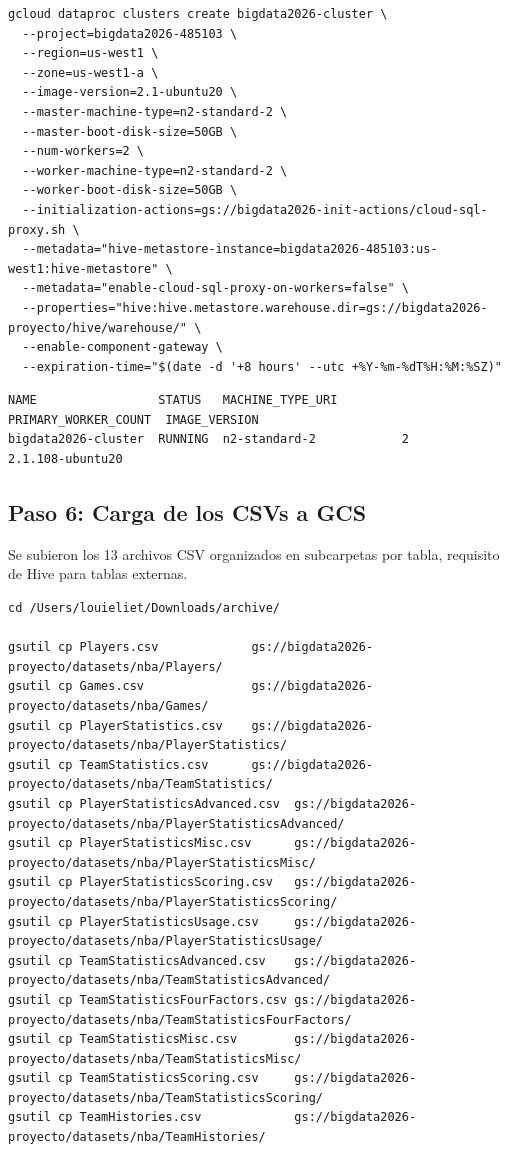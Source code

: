 \documentclass[12pt, letterpaper]{article}
\begin{document}
\begin{lstlisting}[style=codestyle, caption={Creación del cluster Dataproc con Hive sobre Cloud SQL y GCS}]
gcloud dataproc clusters create bigdata2026-cluster \
  --project=bigdata2026-485103 \
  --region=us-west1 \
  --zone=us-west1-a \
  --image-version=2.1-ubuntu20 \
  --master-machine-type=n2-standard-2 \
  --master-boot-disk-size=50GB \
  --num-workers=2 \
  --worker-machine-type=n2-standard-2 \
  --worker-boot-disk-size=50GB \
  --initialization-actions=gs://bigdata2026-init-actions/cloud-sql-proxy.sh \
  --metadata="hive-metastore-instance=bigdata2026-485103:us-west1:hive-metastore" \
  --metadata="enable-cloud-sql-proxy-on-workers=false" \
  --properties="hive:hive.metastore.warehouse.dir=gs://bigdata2026-proyecto/hive/warehouse/" \
  --enable-component-gateway \
  --expiration-time="$(date -d '+8 hours' --utc +%Y-%m-%dT%H:%M:%SZ)"
\end{lstlisting}

\begin{lstlisting}[style=outputstyle, caption={Evidencia --- cluster RUNNING, imagen 2.1 Ubuntu 20, n2-standard-2}]
NAME                 STATUS   MACHINE_TYPE_URI         PRIMARY_WORKER_COUNT  IMAGE_VERSION
bigdata2026-cluster  RUNNING  n2-standard-2            2                     2.1.108-ubuntu20
\end{lstlisting}

\subsection{Paso 6: Carga de los CSVs a GCS}

Se subieron los 13 archivos CSV organizados en subcarpetas por tabla, requisito de Hive para tablas externas.

\begin{lstlisting}[style=codestyle, caption={Carga de los 13 archivos CSV al bucket de GCS}]
cd /Users/louieliet/Downloads/archive/

gsutil cp Players.csv             gs://bigdata2026-proyecto/datasets/nba/Players/
gsutil cp Games.csv               gs://bigdata2026-proyecto/datasets/nba/Games/
gsutil cp PlayerStatistics.csv    gs://bigdata2026-proyecto/datasets/nba/PlayerStatistics/
gsutil cp TeamStatistics.csv      gs://bigdata2026-proyecto/datasets/nba/TeamStatistics/
gsutil cp PlayerStatisticsAdvanced.csv  gs://bigdata2026-proyecto/datasets/nba/PlayerStatisticsAdvanced/
gsutil cp PlayerStatisticsMisc.csv      gs://bigdata2026-proyecto/datasets/nba/PlayerStatisticsMisc/
gsutil cp PlayerStatisticsScoring.csv   gs://bigdata2026-proyecto/datasets/nba/PlayerStatisticsScoring/
gsutil cp PlayerStatisticsUsage.csv     gs://bigdata2026-proyecto/datasets/nba/PlayerStatisticsUsage/
gsutil cp TeamStatisticsAdvanced.csv    gs://bigdata2026-proyecto/datasets/nba/TeamStatisticsAdvanced/
gsutil cp TeamStatisticsFourFactors.csv gs://bigdata2026-proyecto/datasets/nba/TeamStatisticsFourFactors/
gsutil cp TeamStatisticsMisc.csv        gs://bigdata2026-proyecto/datasets/nba/TeamStatisticsMisc/
gsutil cp TeamStatisticsScoring.csv     gs://bigdata2026-proyecto/datasets/nba/TeamStatisticsScoring/
gsutil cp TeamHistories.csv             gs://bigdata2026-proyecto/datasets/nba/TeamHistories/
\end{lstlisting}
\end{document}
